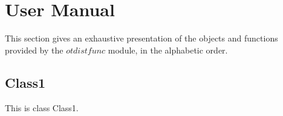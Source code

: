 % 

\section{User Manual}

This section gives an exhaustive presentation of the objects and functions provided by the $otdistfunc$ module, in the alphabetic order.


\subsection{Class1}

This is class Class1.

